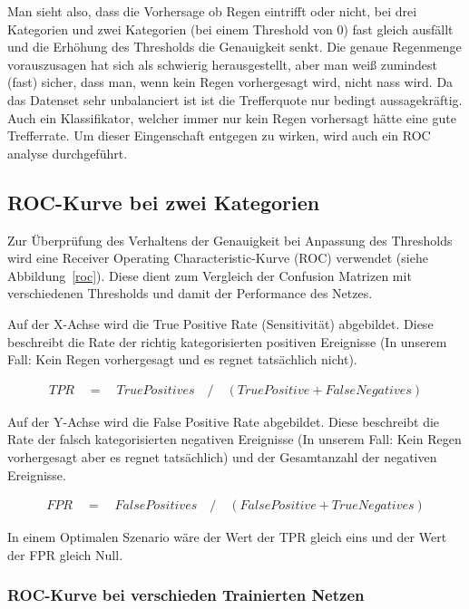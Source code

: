 Man sieht also, dass die Vorhersage ob Regen eintrifft oder nicht, bei drei Kategorien und zwei Kategorien (bei einem Threshold von 0) fast gleich ausfällt und  die Erhöhung des Thresholds die Genauigkeit senkt. Die genaue Regenmenge vorauszusagen hat sich als schwierig herausgestellt, aber man weiß zumindest (fast) sicher, dass man, wenn kein Regen vorhergesagt wird, nicht nass wird.
Da das Datenset sehr unbalanciert ist ist die Trefferquote nur bedingt aussagekräftig. Auch ein Klassifikator, welcher immer nur kein Regen vorhersagt hätte eine gute Trefferrate. Um dieser Eingenschaft entgegen zu wirken, wird auch ein ROC analyse durchgeführt.

\subsection{ROC-Kurve bei zwei Kategorien}
Zur Überprüfung des Verhaltens der Genauigkeit bei Anpassung des Thresholds wird eine Receiver Operating Characteristic-Kurve (ROC) verwendet (siehe Abbildung~\ref{roc}). Diese dient zum Vergleich der Confusion Matrizen mit verschiedenen Thresholds und damit der Performance des Netzes.

Auf der X-Achse wird die True Positive Rate (Sensitivität) abgebildet. Diese beschreibt die Rate der richtig kategorisierten positiven Ereignisse (In unserem Fall: Kein Regen vorhergesagt und es regnet tatsächlich nicht).

\begin{align*}
  TPR \quad	 {=} \quad True Positives \quad / \quad(True Positive + False Negatives)
\end{align*}

Auf der Y-Achse wird die False Positive Rate abgebildet. Diese beschreibt die Rate der falsch kategorisierten negativen Ereignisse (In unserem Fall: Kein Regen vorhergesagt aber es regnet tatsächlich) und der Gesamtanzahl der negativen Ereignisse.

\begin{align*}
  FPR \quad	 {=} \quad False Positives \quad / \quad(False Positive + True Negatives)
\end{align*}

In einem Optimalen Szenario wäre der Wert der TPR gleich eins und der Wert der FPR gleich Null. 


\subsubsection{ROC-Kurve bei verschieden Trainierten Netzen}

